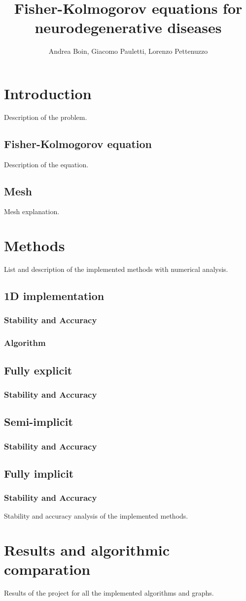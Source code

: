 \documentclass[12pt, letterpaper]{article}
\title{Fisher-Kolmogorov equations for neurodegenerative diseases}
\author{Andrea Boin, Giacomo Pauletti, Lorenzo Pettenuzzo}
\date{}
\begin{document}
\maketitle
\pagebreak

\tableofcontents
\pagebreak

\section{Introduction}
Description of the problem.

\subsection{Fisher-Kolmogorov equation}
Description of the equation.

\subsection{Mesh}
Mesh explanation.

\section{Methods}
List and description of the implemented methods with numerical analysis.

\subsection{1D implementation}
\subsubsection{Stability and Accuracy}
\subsubsection{Algorithm}

\subsection{Fully explicit}
\subsubsection{Stability and Accuracy}

\subsection{Semi-implicit}
\subsubsection{Stability and Accuracy}

\subsection{Fully implicit}
\subsubsection{Stability and Accuracy}

Stability and accuracy analysis of the implemented methods.

\section{Results and algorithmic comparation}
Results of the project for all the implemented algorithms and graphs.
\end{document}
